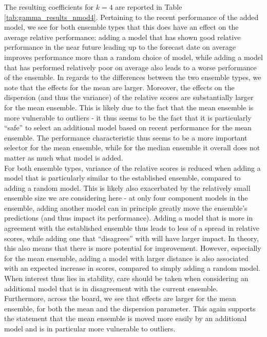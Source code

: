 The resulting coefficients for $k = 4$ are reported in Table \ref{tab:gamma_results_nmod4}. Pertaining to the recent performance of the added model, we see for both ensemble types that this does have an effect on the average relative performance: adding a model that has shown good relative performance in the near future leading up to the forecast date on average improves performance more than a random choice of model, while adding a model that has performed relatively poor on average also leads to a worse performance of the ensemble. In regards to the differences between the two ensemble types, we note that the effects for the mean are larger. Moreover, the effects on the dispersion (and thus the variance) of the relative scores are substantially larger for the mean ensemble. This is likely due to the fact that the mean ensemble is more vulnerable to outliers - it thus seems to be the fact that it is particularly ``safe'' to select an additional model based on recent performance for the mean ensemble. The performance characteristic thus seems to be a more important selector for the mean ensemble, while for the median ensemble it overall does not matter as much what model is added.\\
For both ensemble types, variance of the relative scores is reduced when adding a model that is particularly similar to the established ensemble, compared to adding a random model. This is likely also exacerbated by the relatively small ensemble size we are considering here - at only four component models in the ensemble, adding another model can in principle greatly move the ensemble's predictions (and thus impact its performance). Adding a model that is more in agreement with the established ensemble thus leads to less of a spread in relative scores, while adding one that ``disagrees'' with will have larger impact. In theory, this also means that there is more potential for improvement. However, especially for the mean ensemble, adding a model with larger distance is also associated with an expected increase in scores, compared to simply adding a random model. When interest thus lies in stability, care should be taken when considering an additional model that is in disagreement with the current ensemble.\\
Furthermore, across the board, we see that effects are larger for the mean ensemble, for both the mean and the dispersion parameter. This again supports the statement that the mean ensemble is moved more easily by an additional model and is in particular more vulnerable to outliers. \\
